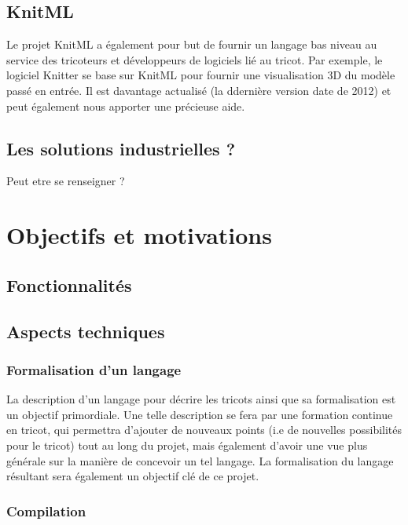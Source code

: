 \documentclass{article}
\begin{document}
\subsection{KnitML}

Le projet KnitML a également pour but de fournir un langage bas niveau au service des tricoteurs et développeurs de logiciels lié au 
tricot. Par exemple, le logiciel Knitter se base sur KnitML pour fournir une visualisation 3D du modèle passé en entrée. Il est davantage
actualisé (la ddernière version date de 2012) et peut également nous apporter une précieuse aide.

\subsection{Les solutions industrielles ?} Peut etre se renseigner ?

\section{Objectifs et motivations} %

\subsection{Fonctionnalités}

\subsection{Aspects techniques}


\subsubsection{Formalisation d'un langage}

La description d'un langage pour décrire les tricots ainsi que sa formalisation est un objectif primordiale.
Une telle description se fera par une formation continue en tricot, qui permettra d'ajouter de nouveaux points (i.e de nouvelles
possibilités pour le tricot) tout au long du projet, mais également d'avoir une vue plus générale sur la manière de concevoir un tel
langage. La formalisation du langage résultant sera également un objectif clé de ce projet.

\subsubsection{Compilation}
\end{document}
